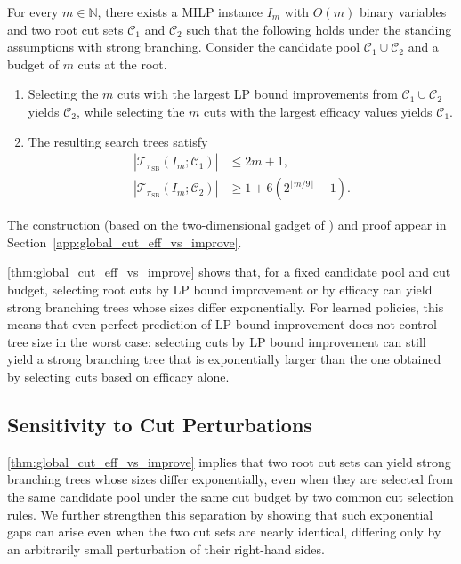 \documentclass[smallextended,envcountsect]{svjour3} %
\newcommand{\N}{\mathbb{N}}
\newcommand{\Tcal}{\mathcal{T}}
\newcommand{\Ccal}{\mathcal{C}}
\newcommand{\0}{\mathbf{0}}
\newcommand{\1}{\mathbf{1}} %
\begin{document}
\begin{theorem}\label{thm:global_cut_eff_vs_improve}
	For every $m\in\N$, there exists a MILP instance $I_m$ with $O(m)$ binary variables and two root cut sets $\Ccal_1$ and $\Ccal_2$ such that the following holds under the standing assumptions with strong branching.
	Consider the candidate pool $\Ccal_1\cup\Ccal_2$ and a budget of $m$ cuts at the root.
	\begin{enumerate}
		\item Selecting the $m$ cuts with the largest LP bound improvements from $\Ccal_1\cup\Ccal_2$ yields $\Ccal_2$, while selecting the $m$ cuts with the largest efficacy values yields $\Ccal_1$.
		\item The resulting search trees satisfy
		      \[
			      \begin{aligned}
				      |\Tcal_{\pi_{\mathrm{SB}}}(I_m;\Ccal_1)| & \le 2m+1,                                     \\
				      |\Tcal_{\pi_{\mathrm{SB}}}(I_m;\Ccal_2)| & \ge 1+6\left(2^{\lfloor m/9\rfloor}-1\right).
			      \end{aligned}
		      \]
	\end{enumerate}
\end{theorem}

The construction (based on the two-dimensional gadget of \citet{shah2025non}) and proof appear in Section~\ref{app:global_cut_eff_vs_improve}.


\cref{thm:global_cut_eff_vs_improve} shows that, for a fixed candidate pool and cut budget, selecting root cuts by LP bound improvement or by efficacy can yield strong branching trees whose sizes differ exponentially.
For learned policies, this means that even perfect prediction of LP bound improvement does not control tree size in the worst case: selecting cuts by LP bound improvement can still yield a strong branching tree that is exponentially larger than the one obtained by selecting cuts based on efficacy alone.

\subsection{Sensitivity to Cut Perturbations}

\cref{thm:global_cut_eff_vs_improve} implies that two root cut sets can yield strong branching trees whose sizes differ exponentially, even when they are selected from the same candidate pool under the same cut budget by two common cut selection rules.
We further strengthen this separation by showing that such exponential gaps can arise even when the two cut sets are nearly identical, differing only by an arbitrarily small perturbation of their right-hand sides.
\end{document}
